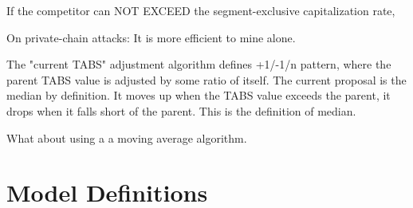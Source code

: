 \documentclass[11pt]{article}
\theoremstyle{plain}
\begin{document}
{If the competitor can NOT EXCEED the segment-exclusive capitalization rate,


On private-chain attacks:
It is more efficient to mine alone.

The "current TABS" adjustment algorithm defines +1/-1/n pattern,
where the parent TABS value is adjusted by some ratio of itself.
The current proposal is the median by definition.
It moves up when the TABS value exceeds the parent,
it drops when it falls short of the parent.
This is the definition of median.

What about using a a moving average algorithm.
}


\section{\normalsize{Model Definitions}}\label{sec: definitions}
\end{document}
